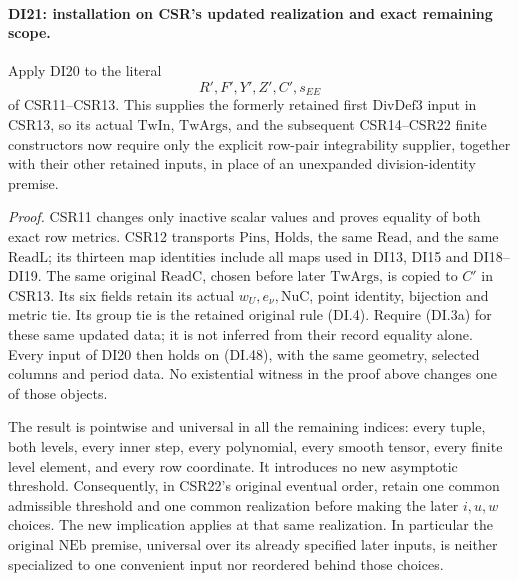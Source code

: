 \paragraph{DI21: installation on CSR's updated realization and exact remaining scope.}
\label{claim:DI21}
Apply DI20 to the literal
\[
                 R',F',Y',Z',C',s_{EE}
 \tag{DI.48}
\]
of CSR11--CSR13. This supplies the formerly retained first
\(\mathrm{DivDef3}\) input in CSR13, so its actual
\(\mathrm{TwIn}\), \(\mathrm{TwArgs}\), and the subsequent
CSR14--CSR22 finite constructors now require only the explicit
row-pair integrability supplier, together with their other retained
inputs, in place of an unexpanded division-identity premise.

\emph{Proof.}
CSR11 changes only inactive scalar values and proves equality of
both exact row metrics. CSR12 transports \(\mathrm{Pins}\),
\(\mathrm{Holds}\), the same \(\mathrm{Read}\), and the same
\(\mathrm{ReadL}\); its thirteen map identities include all maps
used in DI13, DI15 and DI18--DI19. The same original
\(\mathrm{ReadC}\), chosen before later \(\mathrm{TwArgs}\), is
copied to \(C'\) in CSR13. Its six fields retain its actual
\(w_U,e_\nu,\mathrm{NuC}\), point identity, bijection and metric
tie. Its group tie is the retained original rule (DI.4). Require
(DI.3a) for these same updated data; it is not inferred from their
record equality alone. Every input of DI20 then holds on (DI.48),
with the same geometry, selected columns and period data. No
existential witness in the proof above changes one of those objects.

The result is pointwise and universal in all the remaining indices:
every tuple, both levels, every inner step, every polynomial, every
smooth tensor, every finite level element, and every row coordinate.
It introduces no new asymptotic threshold. Consequently, in CSR22's
original eventual order, retain one common admissible threshold and
one common realization before making the later \(i,u,w\) choices.
The new implication applies at that same realization. In particular
the original \(\mathrm{NEb}\) premise, universal over its already
specified later inputs, is neither specialized to one convenient
input nor reordered behind those choices.

